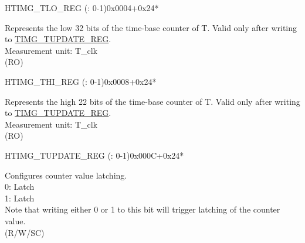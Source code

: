 \begin{register}{H}{TIMG\_TLO\_REG (: 0-1)}{0x0004+0x24*}\label{regdesc:TIMGTXLOREG}
%
\regnewline%
\begin{regdesc}\begin{reglist}
\label{fielddesc:TIMGTXLO}\item [TIMG\_T\regindex{x}\_LO] Represents the low 32 bits of the time-base counter of T. Valid only after writing to \hyperref[regdesc:TIMGTXUPDATEREG]{TIMG\_TUPDATE\_REG}. \\
Measurement unit: T\_clk \\ (RO)
\end{reglist}\end{regdesc}
\end{register}


\begin{register}{H}{TIMG\_THI\_REG (: 0-1)}{0x0008+0x24*}\label{regdesc:TIMGTXHIREG}
%
%
\regnewline%
\begin{regdesc}\begin{reglist}
\label{fielddesc:TIMGTXHI}\item [TIMG\_T\regindex{x}\_HI] Represents the high 22 bits of the time-base counter of T. Valid only after writing to \hyperref[regdesc:TIMGTXUPDATEREG]{TIMG\_TUPDATE\_REG}. \\
Measurement unit: T\_clk \\ (RO)
\end{reglist}\end{regdesc}
\end{register}


\begin{register}{H}{TIMG\_TUPDATE\_REG (: 0-1)}{0x000C+0x24*}\label{regdesc:TIMGTXUPDATEREG}
%
%
\regnewline%
\begin{regdesc}\begin{reglist}
\label{fielddesc:TIMGTXUPDATE}\item [TIMG\_T\regindex{x}\_UPDATE] Configures counter value latching. \\
0: Latch \\
1: Latch \\
Note that writing either 0 or 1 to this bit will trigger latching of the counter value. \\ (R/W/SC)
\end{reglist}\end{regdesc}
\end{register}


